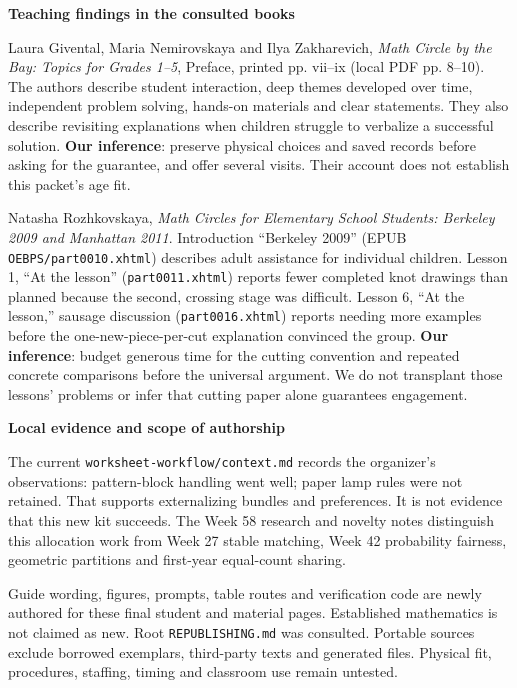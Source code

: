 \documentclass[11pt]{article}
\newcommand{\subhead}[1]{\par\vspace{1mm}\textbf{#1}\par}
\begin{document}
\subhead{Teaching findings in the consulted books}
Laura Givental, Maria Nemirovskaya and Ilya Zakharevich, \emph{Math Circle by the Bay: Topics for Grades 1--5}, Preface, printed pp. vii--ix (local PDF pp. 8--10). The authors describe student interaction, deep themes developed over time, independent problem solving, hands-on materials and clear statements. They also describe revisiting explanations when children struggle to verbalize a successful solution. \textbf{Our inference}: preserve physical choices and saved records before asking for the guarantee, and offer several visits. Their account does not establish this packet's age fit.

Natasha Rozhkovskaya, \emph{Math Circles for Elementary School Students: Berkeley 2009 and Manhattan 2011}. Introduction ``Berkeley 2009'' (EPUB \texttt{OEBPS/part0010.xhtml}) describes adult assistance for individual children. Lesson 1, ``At the lesson'' (\texttt{part0011.xhtml}) reports fewer completed knot drawings than planned because the second, crossing stage was difficult. Lesson 6, ``At the lesson,'' sausage discussion (\texttt{part0016.xhtml}) reports needing more examples before the one-new-piece-per-cut explanation convinced the group. \textbf{Our inference}: budget generous time for the cutting convention and repeated concrete comparisons before the universal argument. We do not transplant those lessons' problems or infer that cutting paper alone guarantees engagement.

\subhead{Local evidence and scope of authorship}
The current \texttt{worksheet-workflow/context.md} records the organizer's observations: pattern-block handling went well; paper lamp rules were not retained. That supports externalizing bundles and preferences. It is not evidence that this new kit succeeds. The Week 58 research and novelty notes distinguish this allocation work from Week 27 stable matching, Week 42 probability fairness, geometric partitions and first-year equal-count sharing.

Guide wording, figures, prompts, table routes and verification code are newly authored for these final student and material pages. Established mathematics is not claimed as new. Root \texttt{REPUBLISHING.md} was consulted. Portable sources exclude borrowed exemplars, third-party texts and generated files. Physical fit, procedures, staffing, timing and classroom use remain untested.
\end{document}
